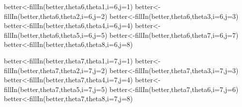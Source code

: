 \documentclass[
]{book}
\newenvironment{Shaded}{\begin{snugshade}}{\end{snugshade}}
\newcommand{\AttributeTok}[1]{\textcolor[rgb]{0.77,0.63,0.00}{#1}}
\newcommand{\DecValTok}[1]{\textcolor[rgb]{0.00,0.00,0.81}{#1}}
\newcommand{\FunctionTok}[1]{\textcolor[rgb]{0.00,0.00,0.00}{#1}}
\newcommand{\NormalTok}[1]{#1}
\newcommand{\OtherTok}[1]{\textcolor[rgb]{0.56,0.35,0.01}{#1}}
\theoremstyle{definition}
\theoremstyle{definition}
\theoremstyle{definition}
\theoremstyle{definition}
\theoremstyle{remark}
\begin{document}
\begin{Shaded}
\begin{Highlighting}[]
  
\NormalTok{  better}\OtherTok{\textless{}{-}}\FunctionTok{fillIn}\NormalTok{(better,theta6,theta1,}\AttributeTok{i=}\DecValTok{6}\NormalTok{,}\AttributeTok{j=}\DecValTok{1}\NormalTok{)}
\NormalTok{  better}\OtherTok{\textless{}{-}}\FunctionTok{fillIn}\NormalTok{(better,theta6,theta2,}\AttributeTok{i=}\DecValTok{6}\NormalTok{,}\AttributeTok{j=}\DecValTok{2}\NormalTok{)}
\NormalTok{  better}\OtherTok{\textless{}{-}}\FunctionTok{fillIn}\NormalTok{(better,theta6,theta3,}\AttributeTok{i=}\DecValTok{6}\NormalTok{,}\AttributeTok{j=}\DecValTok{3}\NormalTok{)}
\NormalTok{  better}\OtherTok{\textless{}{-}}\FunctionTok{fillIn}\NormalTok{(better,theta6,theta4,}\AttributeTok{i=}\DecValTok{6}\NormalTok{,}\AttributeTok{j=}\DecValTok{4}\NormalTok{)}
\NormalTok{  better}\OtherTok{\textless{}{-}}\FunctionTok{fillIn}\NormalTok{(better,theta6,theta5,}\AttributeTok{i=}\DecValTok{6}\NormalTok{,}\AttributeTok{j=}\DecValTok{5}\NormalTok{)}
\NormalTok{  better}\OtherTok{\textless{}{-}}\FunctionTok{fillIn}\NormalTok{(better,theta6,theta7,}\AttributeTok{i=}\DecValTok{6}\NormalTok{,}\AttributeTok{j=}\DecValTok{7}\NormalTok{)}
\NormalTok{  better}\OtherTok{\textless{}{-}}\FunctionTok{fillIn}\NormalTok{(better,theta6,theta8,}\AttributeTok{i=}\DecValTok{6}\NormalTok{,}\AttributeTok{j=}\DecValTok{8}\NormalTok{)}
  
\NormalTok{    better}\OtherTok{\textless{}{-}}\FunctionTok{fillIn}\NormalTok{(better,theta7,theta1,}\AttributeTok{i=}\DecValTok{7}\NormalTok{,}\AttributeTok{j=}\DecValTok{1}\NormalTok{)}
\NormalTok{  better}\OtherTok{\textless{}{-}}\FunctionTok{fillIn}\NormalTok{(better,theta7,theta2,}\AttributeTok{i=}\DecValTok{7}\NormalTok{,}\AttributeTok{j=}\DecValTok{2}\NormalTok{)}
\NormalTok{  better}\OtherTok{\textless{}{-}}\FunctionTok{fillIn}\NormalTok{(better,theta7,theta3,}\AttributeTok{i=}\DecValTok{7}\NormalTok{,}\AttributeTok{j=}\DecValTok{3}\NormalTok{)}
\NormalTok{  better}\OtherTok{\textless{}{-}}\FunctionTok{fillIn}\NormalTok{(better,theta7,theta4,}\AttributeTok{i=}\DecValTok{7}\NormalTok{,}\AttributeTok{j=}\DecValTok{4}\NormalTok{)}
\NormalTok{  better}\OtherTok{\textless{}{-}}\FunctionTok{fillIn}\NormalTok{(better,theta7,theta5,}\AttributeTok{i=}\DecValTok{7}\NormalTok{,}\AttributeTok{j=}\DecValTok{5}\NormalTok{)}
\NormalTok{  better}\OtherTok{\textless{}{-}}\FunctionTok{fillIn}\NormalTok{(better,theta7,theta6,}\AttributeTok{i=}\DecValTok{7}\NormalTok{,}\AttributeTok{j=}\DecValTok{6}\NormalTok{)}
\NormalTok{  better}\OtherTok{\textless{}{-}}\FunctionTok{fillIn}\NormalTok{(better,theta7,theta8,}\AttributeTok{i=}\DecValTok{7}\NormalTok{,}\AttributeTok{j=}\DecValTok{8}\NormalTok{)}
  

\end{Highlighting}
\end{Shaded}
\end{document}
